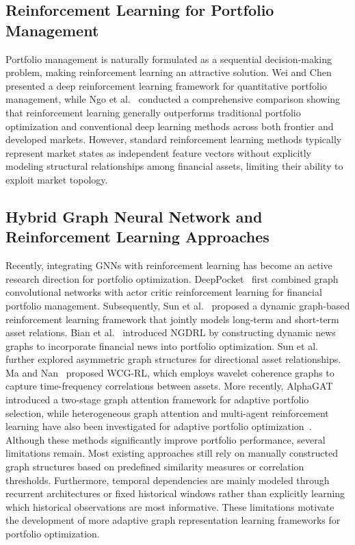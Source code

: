 \documentclass[runningheads]{llncs}
\begin{document}
\subsection{Reinforcement Learning for Portfolio Management}

Portfolio management is naturally formulated as a sequential decision-making problem, making reinforcement learning an attractive solution. Wei and Chen~\cite{wei2023deep} presented a deep reinforcement learning framework for quantitative portfolio management, while Ngo et al.~\cite{ngo2023reinforcement} conducted a comprehensive comparison showing that reinforcement learning generally outperforms traditional portfolio optimization and conventional deep learning methods across both frontier and developed markets. However, standard reinforcement learning methods typically represent market states as independent feature vectors without explicitly modeling structural relationships among financial assets, limiting their ability to exploit market topology.

\subsection{Hybrid Graph Neural Network and Reinforcement Learning Approaches}

Recently, integrating GNNs with reinforcement learning has become an active research direction for portfolio optimization. DeepPocket~\cite{soleymani2021deep} first combined graph convolutional networks with actor critic reinforcement learning for financial portfolio management. Subsequently, Sun et al.~\cite{sun2024dynamic} proposed a dynamic graph-based reinforcement learning framework that jointly models long-term and short-term asset relations. Bian et al.~\cite{bian2024ngdrl} introduced NGDRL by constructing dynamic news graphs to incorporate financial news into portfolio optimization. Sun et al.~\cite{sun2024asymmetric} further explored asymmetric graph structures for directional asset relationships. Ma and Nan~\cite{ma2024dynamic} proposed WCG-RL, which employs wavelet coherence graphs to capture time-frequency correlations between assets. More recently, AlphaGAT~\cite{li2025alphagat} introduced a two-stage graph attention framework for adaptive portfolio selection, while heterogeneous graph attention and multi-agent reinforcement learning have also been investigated for adaptive portfolio optimization~\cite{srep2026graph}. Although these methods significantly improve portfolio performance, several limitations remain. Most existing approaches still rely on manually constructed graph structures based on predefined similarity measures or correlation thresholds. Furthermore, temporal dependencies are mainly modeled through recurrent architectures or fixed historical windows rather than explicitly learning which historical observations are most informative. These limitations motivate the development of more adaptive graph representation learning frameworks for portfolio optimization.
\end{document}
